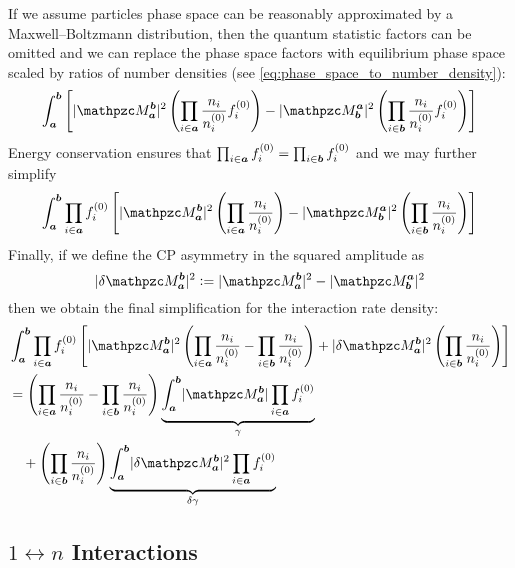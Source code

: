 \documentclass[
  a4paper,             %
  11pt,                %
  oneside,             %
  onecolumn,           %
  bibliography=totoc,  %
  final,               %
]{scrartcl}
\begin{document}
If we assume particles phase space can be reasonably approximated by a
Maxwell--Boltzmann distribution, then the quantum statistic factors can be
omitted and we can replace the phase space factors with equilibrium phase space
scaled by ratios of number densities (see
\cref{eq:phase_space_to_number_density}):
\begin{equation}
  \int_{\vt a}^{\vt b} \left[ \abs{\pzcM_{\vt a}^{\vt b}}^2 \left( \prod_{i \in \vt a} \frac{n_i}{n_i^{(0)}} f_i^{(0)} \right)
  - \abs{\pzcM_{\vt b}^{\vt a}}^2 \left( \prod_{i \in \vt b} \frac{n_i}{n_i^{(0)}} f_i^{(0)} \right) \right]
\end{equation}
Energy conservation ensures that \(\prod_{i \in \boldsymbol{a}} f_i^{(0)} = \prod_{i \in
\boldsymbol{b}} f_i^{(0)}\) and we may further simplify
\begin{equation}
  \int_{\vt a}^{\vt b} \prod_{i \in \vt a} f_i^{(0)} \left[
    \abs{\pzcM_{\vt a}^{\vt b}}^2 \left( \prod_{i \in \vt a} \frac{n_i}{n_i^{(0)}} \right)
    - \abs{\pzcM_{\vt b}^{\vt a}}^2 \left( \prod_{i \in \vt b} \frac{n_i}{n_i^{(0)}} \right)
  \right]
\end{equation}
Finally, if we define the CP asymmetry in the squared amplitude as
\begin{equation}
  \abs{\delta \pzcM_{\vt a}^{\vt b}}^2 \defeq \abs{\pzcM_{\vt a}^{\vt b}}^2 - \abs{\pzcM_{\vt b}^{\vt a}}^2
\end{equation}
then we obtain the final simplification for the interaction rate density:
\begin{equation}
  \begin{aligned}
    &\int_{\vt a}^{\vt b} \prod_{i \in \vt a} f_i^{(0)} \left[
      \abs{\pzcM_{\vt a}^{\vt b}}^2 \left( \prod_{i \in \vt a} \frac{n_i}{n_i^{(0)}} - \prod_{i \in \vt b} \frac{n_i}{n_i^{(0)}} \right)
      + \abs{\delta \pzcM_{\vt a}^{\vt b}}^2 \left( \prod_{i \in \vt b} \frac{n_i}{n_i^{(0)}} \right)
    \right] \\
    &= \left( \prod_{i \in \vt a} \frac{n_i}{n_i^{(0)}} - \prod_{i \in \vt b} \frac{n_i}{n_i^{(0)}} \right)
      \underbrace{\int_{\vt a}^{\vt b} \abs{\pzcM_{\vt a}^{\vt b}} \prod_{i \in \vt a} f_i^{(0)}}_{\gamma} \\
    &\quad + \left( \prod_{i \in \vt b} \frac{n_i}{n_i^{(0)}} \right) \underbrace{\int_{\vt a}^{\vt b} \abs{\delta \pzcM_{\vt a}^{\vt b}}^2 \prod_{i \in \vt a} f_i^{(0)}}_{\delta \gamma}
  \end{aligned}
\end{equation}

\subsection{\texorpdfstring{\(1 \leftrightarrow n\)}{1 to n} Interactions}
\end{document}
